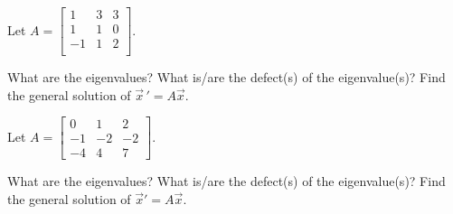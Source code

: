 \begin{exercise}\ansMark%
Let $A =
\left[ \begin{smallmatrix}
1 & 3 & 3 \\
1 & 1 & 0 \\
-1 & 1 & 2 \\
\end{smallmatrix}\right]$.  
\begin{tasks}
\task What are the eigenvalues?
\task What is/are the defect(s) of the eigenvalue(s)?
\task Find the general solution of $\vec{x}\,' = A\vec{x}$.
\end{tasks}
\end{exercise}

\begin{exercise}
Let
$A = \left[ \begin{smallmatrix}
0 & 1 & 2 \\
-1 & -2 & -2 \\
-4 & 4 & 7
\end{smallmatrix} \right]$.
\begin{tasks}
\task What are the eigenvalues?
\task What is/are the defect(s) of the eigenvalue(s)?
\task Find the general solution of ${\vec{x}}' = A \vec{x}$.
\end{tasks}
\end{exercise}

